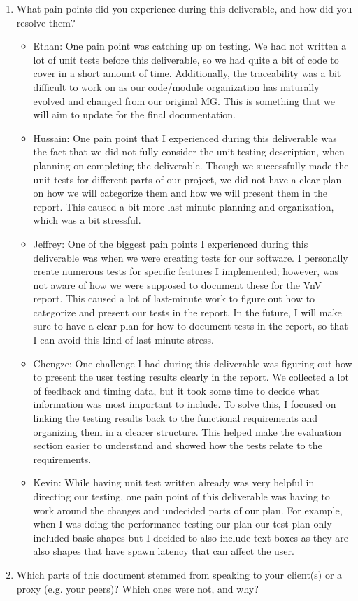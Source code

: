 \documentclass[12pt, titlepage]{article}
\begin{document}
\begin{enumerate}
\begin{itemize}
  \end{itemize}

  \item What pain points did you experience during this deliverable, and how
    did you resolve them?
  \begin{itemize}
    \item Ethan: One pain point was catching up on testing. We had not written
      a lot of unit tests before this deliverable, so we had quite a bit of
      code to cover in a short amount of time. Additionally, the traceability
      was a bit difficult to work on as our code/module organization has
      naturally evolved and changed from our original MG. This is something
      that we will aim to update for the final documentation.
    \item Hussain: One pain point that I experienced during this deliverable was
    the fact that we did not fully consider the unit testing description, when
    planning on completing the deliverable. Though we successfully made the
    unit tests for different parts of our project, we did not have a clear plan
    on how we will categorize them and how we will present them in the report.
    This caused a bit more last-minute planning and organization, which was a bit stressful.
    \item Jeffrey: One of the biggest pain points I experienced during this deliverable
    was when we were creating tests for our software. I personally create numerous tests for
    specific features I implemented; however, was not aware of how we were supposed to document
    these for the VnV report. This caused a lot of last-minute work to figure out how to categorize and present
    our tests in the report. In the future, I will make sure to have a clear plan for how to document
    tests in the report, so that I can avoid this kind of last-minute stress.
    \item Chengze: One challenge I had during this deliverable was figuring out how to
    present the user testing results clearly in the report. We collected a lot of
    feedback and timing data, but it took some time to decide what information was
    most important to include. To solve this, I focused on linking the testing
    results back to the functional requirements and organizing them in a clearer
    structure. This helped make the evaluation section easier to understand and
    showed how the tests relate to the requirements.
    \item Kevin: While having unit test written already was very helpful in
     directing our testing, one pain point of this deliverable was having to
      work around the changes and undecided parts of our plan. For example,
       when I was doing the performance testing our plan our test plan only
        included basic shapes but I decided to also include text boxes as
         they are also shapes that have spawn latency that can affect the
          user.
  \end{itemize}
  \item Which parts of this document stemmed from speaking to your client(s) or
  a proxy (e.g. your peers)? Which ones were not, and why?


\end{enumerate}
\end{document}

